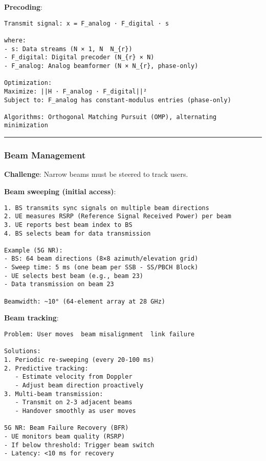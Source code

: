 \textbf{Precoding}:

\begin{verbatim}
Transmit signal: x = F_analog · F_digital · s

where:
- s: Data streams (N × 1, N  N_{r})
- F_digital: Digital precoder (N_{r} × N)
- F_analog: Analog beamformer (N × N_{r}, phase-only)

Optimization:
Maximize: ||H · F_analog · F_digital||²
Subject to: F_analog has constant-modulus entries (phase-only)

Algorithms: Orthogonal Matching Pursuit (OMP), alternating minimization
\end{verbatim}

\begin{center}\rule{0.5\linewidth}{0.5pt}\end{center}

\subsubsection{Beam Management}\label{beam-management}

\textbf{Challenge}: Narrow beams must be steered to track users.

\textbf{Beam sweeping (initial access)}:

\begin{verbatim}
1. BS transmits sync signals on multiple beam directions
2. UE measures RSRP (Reference Signal Received Power) per beam
3. UE reports best beam index to BS
4. BS selects beam for data transmission

Example (5G NR):
- BS: 64 beam directions (8×8 azimuth/elevation grid)
- Sweep time: 5 ms (one beam per SSB - SS/PBCH Block)
- UE selects best beam (e.g., beam 23)
- Data transmission on beam 23

Beamwidth: ~10° (64-element array at 28 GHz)
\end{verbatim}

\textbf{Beam tracking}:

\begin{verbatim}
Problem: User moves  beam misalignment  link failure

Solutions:
1. Periodic re-sweeping (every 20-100 ms)
2. Predictive tracking:
   - Estimate velocity from Doppler
   - Adjust beam direction proactively
3. Multi-beam transmission:
   - Transmit on 2-3 adjacent beams
   - Handover smoothly as user moves

5G NR: Beam Failure Recovery (BFR)
- UE monitors beam quality (RSRP)
- If below threshold: Trigger beam switch
- Latency: <10 ms for recovery
\end{verbatim}

